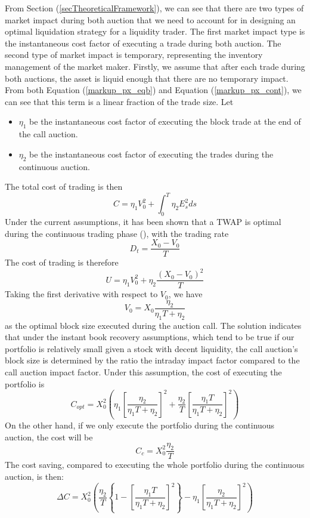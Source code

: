 \documentclass{article}
\begin{document}
From Section (\ref{secTheoreticalFramework}), we can see that there are two types of market impact during both auction that we need to account for in designing an optimal liquidation strategy for a liquidity trader. The first market impact type is the instantaneous cost factor of executing a trade during both auction. The second type of market impact is temporary, representing the inventory management of the market maker. Firstly, we assume that after each trade during both auctions, the asset is liquid enough that there are no temporary impact. From both Equation (\ref{markup_px_eqb}) and Equation (\ref{markup_px_cont}), we can see that this term is a linear fraction of the trade size. Let
\begin{itemize}
  \item $\eta_1$ be the instantaneous cost factor of executing the block trade at the end of the call auction.
  \item $\eta_2$ be the instantaneous cost factor of executing the trades during the continuous auction.
\end{itemize}

The total cost of trading is then
\[
  C =\eta_1  V_0^2 + \int_0^T \eta_2 E_s^2 ds
\]
Under the current assumptions, it has been shown that a TWAP is optimal during the continuous trading phase (\cite{AlmgrenChriss2000}), with the trading rate
\[
  D_t = \frac{X_0 - V_0}{T}
\]
The cost of trading is therefore
\[
  U = \eta_1 V_0^2 + \eta_2 \frac{(X_0 - V_0)^2}{T}
\]
Taking the first derivative with respect to $V_0$, we have
\[
  V_0= X_0 \frac{\eta_2}{\eta_1 T +\eta_2}
\]
as the optimal block size executed during the auction call. The solution indicates that under the instant book recovery assumptions, which tend to be true if our portfolio is relatively small given a stock with decent liquidity, the call auction's block size is determined by the ratio the intraday impact factor compared to the call auction impact factor. Under this assumption, the cost of executing the portfolio is
\[
  C_{opt}  = X_0^2\left(\eta_1  \left[\frac{\eta_2}{\eta_1 T + \eta_2}\right]^2 + \frac{\eta_2}{T}  \left[\frac{\eta_1 T}{\eta_1 T + \eta_2}\right]^2 \right)
\]
On the other hand, if we only execute the portfolio during the continuous auction, the cost will be
\[
  C_c =  X_0^2 \frac{\eta_2}{T}
\]
The cost saving, compared to executing the whole portfolio during the continuous auction, is then:
\[
  \Delta C = X_0^2\left(\frac{\eta_2}{T}  \left\{1 - \left[ \frac{\eta_1 T}{\eta_1 T + \eta_2}\right]^2\right\} - \eta_1  \left[\frac{\eta_2}{\eta_1 T + \eta_2}\right]^2\right)
\]
\end{document}
